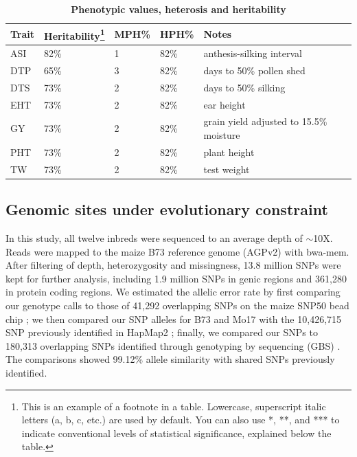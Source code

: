 \documentclass[9pt,twocolumn,twoside]{gsajnl}
\begin{document}
\begin{table}[htbp]
\centering
\caption{\bf Phenotypic values, heterosis and heritability}
\begin{tableminipage}{\textwidth}
\begin{tabularx}{\textwidth}{XXXXX}
\hline
Trait & Heritability\footnote{This is an example of a footnote in a table. Lowercase, superscript italic letters (a, b, c, etc.) are used by default. You can also use *, **, and *** to indicate conventional levels of statistical significance, explained below the table.} & MPH\% & HPH\% & Notes \\
\hline
ASI & 82\% & 1 & 82\% & anthesis-silking interval \\
DTP & 65\% & 3 & 82\% & days to 50\% pollen shed \\
DTS & 73\% & 2 & 82\% & days to 50\% silking \\
EHT & 73\% & 2 & 82\% & ear height \\
GY & 73\% & 2 & 82\% & grain yield adjusted to 15.5\% moisture \\
PHT & 73\% & 2 & 82\% & plant height \\
TW & 73\% & 2 & 82\% & test weight \\
\hline
\end{tabularx}
  \label{tab:pheno}
\end{tableminipage}
\end{table}




\subsection*{Genomic sites under evolutionary constraint}

In this study, all twelve inbreds were sequenced to an average depth of $\sim$10X. Reads were mapped to the maize B73 reference genome (AGPv2) with bwa-mem. After filtering of depth, heterozygosity and missingness, 13.8 million SNPs were kept for further analysis, including 1.9 million SNPs in genic regions and 361,280 in protein coding regions. We estimated the allelic error rate by first comparing our genotype calls to those of 41,292 overlapping SNPs on the maize SNP50 bead chip \citep{Heerwaarden2012}; we then compared our SNP alleles for B73 and Mo17 with the 10,426,715 SNP previously identified in HapMap2 \citep{Chia2012}; finally, we compared our SNPs to 180,313 overlapping SNPs identified through genotyping by sequencing (GBS) \citep{Romay2013}. The comparisons showed 99.12\% allele similarity with shared SNPs previously identified.  
\end{document}
